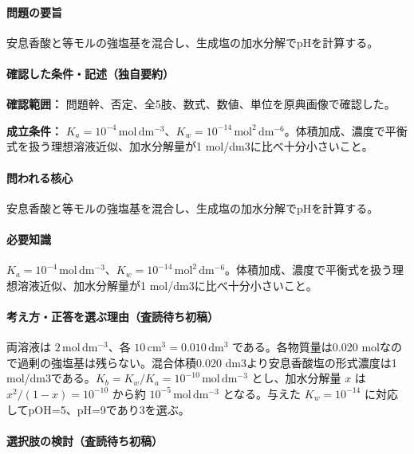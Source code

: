 \paragraph{問題の要旨} 安息香酸と等モルの強塩基を混合し、生成塩の加水分解でpHを計算する。

\paragraph{確認した条件・記述（独自要約）}\mbox{}\par

\noindent\textbf{確認範囲：} 問題幹、否定、全5肢、数式、数値、単位を原典画像で確認した。\par

\noindent\textbf{成立条件：} \(K_a=10^{-4}\,\mathrm{mol\,dm^{-3}}\)、\(K_w=10^{-14}\,\mathrm{mol^2\,dm^{-6}}\)。体積加成、濃度で平衡式を扱う理想溶液近似、加水分解量が1 mol/dm3に比べ十分小さいこと。\par

\paragraph{問われる核心} 安息香酸と等モルの強塩基を混合し、生成塩の加水分解でpHを計算する。

\paragraph{必要知識} \(K_a=10^{-4}\,\mathrm{mol\,dm^{-3}}\)、\(K_w=10^{-14}\,\mathrm{mol^2\,dm^{-6}}\)。体積加成、濃度で平衡式を扱う理想溶液近似、加水分解量が1 mol/dm3に比べ十分小さいこと。

\paragraph{考え方・正答を選ぶ理由（査読待ち初稿）} 両溶液は \(2\,\mathrm{mol\,dm^{-3}}\)、各 \(10\,\mathrm{cm^3}=0.010\,\mathrm{dm^3}\) である。各物質量は0.020 molなので過剰の強塩基は残らない。混合体積0.020 dm3より安息香酸塩の形式濃度は1 mol/dm3である。\(K_b=K_w/K_a=10^{-10}\,\mathrm{mol\,dm^{-3}}\) とし、加水分解量 \(x\) は \(x^2/(1-x)=10^{-10}\) から約 \(10^{-5}\,\mathrm{mol\,dm^{-3}}\) となる。与えた \(K_w=10^{-14}\) に対応してpOH=\allowbreak{}5、pH=\allowbreak{}9であり3を選ぶ。

\paragraph{選択肢の検討（査読待ち初稿）}\mbox{}\par

